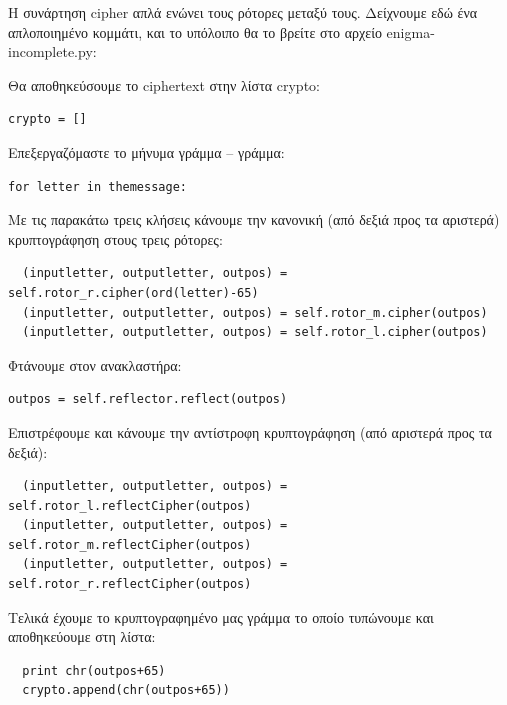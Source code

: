 \documentclass[a4paper,twoside,12pt]{article}
\begin{document}
Η συνάρτηση cipher απλά ενώνει τους ρότορες μεταξύ τους. Δείχνουμε εδώ ένα απλοποιημένο κομμάτι, και το υπόλοιπο θα το βρείτε στο αρχείο enigma-incomplete.py:

Θα αποθηκεύσουμε το ciphertext στην λίστα crypto:

\begin{verbatim}
crypto = []
\end{verbatim}

Επεξεργαζόμαστε το μήνυμα γράμμα – γράμμα:

\begin{verbatim}
for letter in themessage:
\end{verbatim}

Με τις παρακάτω τρεις κλήσεις κάνουμε την κανονική (από δεξιά προς τα αριστερά) κρυπτογράφηση στους τρεις ρότορες:

\footnotesize
\begin{verbatim}
  (inputletter, outputletter, outpos) = self.rotor_r.cipher(ord(letter)-65)
  (inputletter, outputletter, outpos) = self.rotor_m.cipher(outpos)
  (inputletter, outputletter, outpos) = self.rotor_l.cipher(outpos)
\end{verbatim}
\normalsize

Φτάνουμε στον ανακλαστήρα:

\begin{verbatim}
outpos = self.reflector.reflect(outpos)
\end{verbatim}

Επιστρέφουμε και κάνουμε την αντίστροφη κρυπτογράφηση (από αριστερά προς τα δεξιά):

\footnotesize
\begin{verbatim}
  (inputletter, outputletter, outpos) = self.rotor_l.reflectCipher(outpos)
  (inputletter, outputletter, outpos) = self.rotor_m.reflectCipher(outpos)
  (inputletter, outputletter, outpos) = self.rotor_r.reflectCipher(outpos)
\end{verbatim}
\normalsize

Τελικά έχουμε το κρυπτογραφημένο μας γράμμα το οποίο τυπώνουμε και αποθηκεύουμε στη λίστα:

\begin{verbatim}
  print chr(outpos+65)
  crypto.append(chr(outpos+65))
\end{verbatim}
\end{document}
